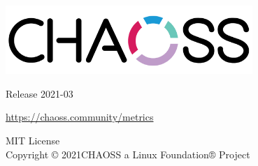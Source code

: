 \begin{titlepage}
    \begin{center}
        \vspace*{1.5cm}
            
        \includegraphics[width=0.7\textwidth]{Chaoss_logo.png}
        
	\vspace{2cm}


        \vspace{1cm}
        \Huge
        Release 2021-03
            
        \vspace{1.5cm}
        
	\LARGE
	    \url{https://chaoss.community/metrics}
            
        \vfill
            
        \Large
        MIT License\\
        Copyright © 2021CHAOSS a Linux Foundation® Project\\
            
    \end{center}
\end{titlepage}

\thispagestyle{empty}
